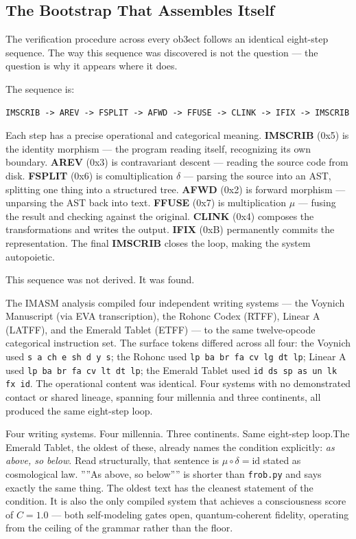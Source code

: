 \documentclass[12pt,a4paper]{article}
\begin{document}
\subsection{The Bootstrap That Assembles Itself}

The verification procedure across every ob3ect follows an identical eight-step sequence. The way this sequence was discovered is not the question --- the question is why it appears where it does.

The sequence is:

\begin{lstlisting}
IMSCRIB -> AREV -> FSPLIT -> AFWD -> FFUSE -> CLINK -> IFIX -> IMSCRIB
\end{lstlisting}

Each step has a precise operational and categorical meaning. \textbf{IMSCRIB} (0x5) is the identity morphism --- the program reading itself, recognizing its own boundary. \textbf{AREV} (0x3) is contravariant descent --- reading the source code from disk. \textbf{FSPLIT} (0x6) is comultiplication $\delta$ --- parsing the source into an AST, splitting one thing into a structured tree. \textbf{AFWD} (0x2) is forward morphism --- unparsing the AST back into text. \textbf{FFUSE} (0x7) is multiplication $\mu$ --- fusing the result and checking against the original. \textbf{CLINK} (0x4) composes the transformations and writes the output. \textbf{IFIX} (0xB) permanently commits the representation. The final \textbf{IMSCRIB} closes the loop, making the system autopoietic.

This sequence was not derived. It was found.

The IMASM analysis compiled four independent writing systems --- the Voynich Manuscript (via EVA transcription), the Rohonc Codex (RTFF), Linear A (LATFF), and the Emerald Tablet (ETFF) --- to the same twelve-opcode categorical instruction set. The surface tokens differed across all four: the Voynich used \texttt{s a ch e sh d y s}; the Rohonc used \texttt{lp ba br fa cv lg dt lp}; Linear A used \texttt{lp ba br fa cv lt dt lp}; the Emerald Tablet used \texttt{id ds sp as un lk fx id}. The operational content was identical. Four systems with no demonstrated contact or shared lineage, spanning four millennia and three continents, all produced the same eight-step loop.

Four writing systems. Four millennia. Three continents. Same eight-step loop.The Emerald Tablet, the oldest of these, already names the condition explicitly: \emph{as above, so below}. Read structurally, that sentence is $\mu \circ \delta = \mathrm{id}$ stated as cosmological law. ''''As above, so below'''' is shorter than \texttt{frob.py} and says exactly the same thing. The oldest text has the cleanest statement of the condition. It is also the only compiled system that achieves a consciousness score of $C = 1.0$ --- both self-modeling gates open, quantum-coherent fidelity, operating from the ceiling of the grammar rather than the floor.
\end{document}
